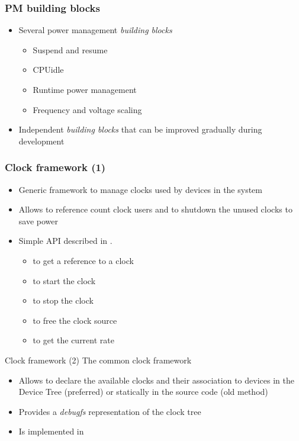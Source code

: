 \begin{frame}
  \frametitle{PM building blocks}
  \begin{itemize}
  \item Several power management \emph{building blocks}
    \begin{itemize}
    \item Suspend and resume
    \item CPUidle
    \item Runtime power management
    \item Frequency and voltage scaling
    \end{itemize}
  \item Independent \emph{building blocks} that can be improved
    gradually during development
  \end{itemize}
\end{frame}

\begin{frame}
  \frametitle{Clock framework (1)}
  \begin{itemize}
  \item Generic framework to manage clocks used by devices in the
    system
  \item Allows to reference count clock users and to shutdown the
    unused clocks to save power
  \item Simple API described in .
    \begin{itemize}
    \item {} to get a reference to a clock
    \item {} to start the clock
    \item {} to stop the clock
    \item {} to free the clock source
    \item {} to get the current rate
    \end{itemize}
  \end{itemize}
\end{frame}


\begin{frame}{Clock framework (2)}
  The common clock framework
  \begin{itemize}
  \item Allows to declare the available clocks and their association
    to devices in the Device Tree (preferred) or statically in the
    source code (old method)
  \item Provides a {\em debugfs} representation of the clock tree
  \item Is implemented in 
  \end{itemize}
\end{frame}

